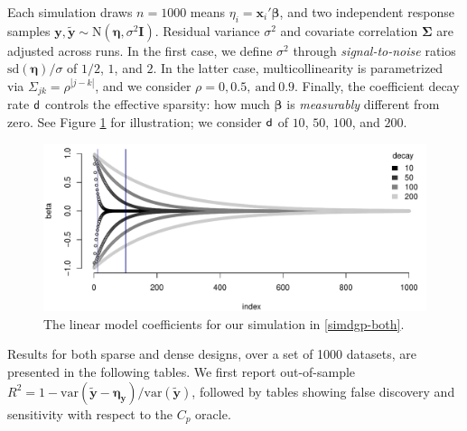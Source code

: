 \documentclass[12pt]{article}
\newcommand{\bs}[1]{\boldsymbol{#1}}
\newcommand{\mr}[1]{\mathrm{#1}}
\newcommand{\bm}[1]{\mathbf{#1}}
\begin{document}
\vspace{-.4cm}
\noindent
Each simulation draws $n=1000$ means $\eta_i =
\bm{x}_i'\bs{\beta}$, and two independent response samples 
$\bm{y},\bm{\tilde y} \sim \mr{N}(\bs{\eta},\sigma^2\bm{I})$. Residual
variance $\sigma^2$ and covariate correlation $\bs{\Sigma}$ are adjusted across
runs.  In the first case, we define $\sigma^2$ through {\it signal-to-noise}
ratios $\mr{sd}(\bs{\eta})/\sigma$ of $1/2$, $1$, and $2$.  In the latter
case, multicollinearity is parametrized via $\Sigma_{jk} =
\rho^{|j-k|}$, and we consider $\rho = 0, 0.5,~\text{and}~0.9$.
Finally, the coefficient decay rate ${\sf d}$ controls the effective sparsity: how much $\bs{\beta}$ is \textit{measurably} different from zero. See Figure \ref{fig:betadecay} for illustration; we consider
${\sf d}$ of $10$, $50$, $100$, and $200$.

\begin{figure}[h]\centering
\includegraphics[width=.8\textwidth]{graphs/betadecay}
\caption{\label{fig:betadecay} The linear model coefficients for our simulation in \ref{simdgp-both}.}
\end{figure}

Results for both sparse and dense designs, over a set of 1000 datasets, are presented in the following tables.  We first report out-of-sample $R^2 = 1 -
\mr{var}(\bm{\tilde y} - \bs{\eta}_\bm{y})/\mr{var}(\bm{\tilde y})$, followed by tables showing false discovery and sensitivity with respect to the $C_p$
oracle. 




\end{document}
